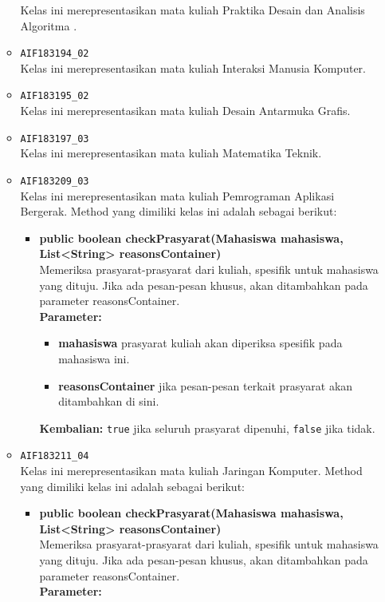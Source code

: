 \begin{enumerate}
\begin{itemize}
		Kelas ini merepresentasikan mata kuliah Praktika Desain dan Analisis Algoritma .
		\item \texttt{AIF183194\_02} \\
		Kelas ini merepresentasikan mata kuliah Interaksi Manusia Komputer.
		\item \texttt{AIF183195\_02} \\
		Kelas ini merepresentasikan mata kuliah Desain Antarmuka Grafis.
		\item \texttt{AIF183197\_03} \\
		Kelas ini merepresentasikan mata kuliah Matematika Teknik.
		\item \texttt{AIF183209\_03} \\
		Kelas ini merepresentasikan mata kuliah Pemrograman Aplikasi Bergerak. Method yang dimiliki kelas ini adalah sebagai berikut: 
		\begin{itemize}
			\item \textbf{public boolean checkPrasyarat(Mahasiswa mahasiswa, List<String> reasonsContainer)}\\
			Memeriksa prasyarat-prasyarat dari kuliah, spesifik untuk mahasiswa yang dituju. Jika ada pesan-pesan khusus, akan ditambahkan pada parameter reasonsContainer.\\
			\textbf{Parameter:}
			\begin{itemize}
				\item \textbf{mahasiswa} prasyarat kuliah akan diperiksa spesifik pada mahasiswa ini.
				\item \textbf{reasonsContainer} jika pesan-pesan terkait prasyarat akan ditambahkan di sini.
			\end{itemize}
			\textbf{Kembalian:} \texttt{true} jika seluruh prasyarat dipenuhi, \texttt{false} jika tidak.
		\end{itemize}
		\item \texttt{AIF183211\_04} \\
		Kelas ini merepresentasikan mata kuliah Jaringan Komputer. Method yang dimiliki kelas ini adalah sebagai berikut: 
		\begin{itemize}
			\item \textbf{public boolean checkPrasyarat(Mahasiswa mahasiswa, List<String> reasonsContainer)}\\
			Memeriksa prasyarat-prasyarat dari kuliah, spesifik untuk mahasiswa yang dituju. Jika ada pesan-pesan khusus, akan ditambahkan pada parameter reasonsContainer.\\
			\textbf{Parameter:}
			\begin{itemize}

\end{itemize}
\end{itemize}
\end{itemize}
\end{enumerate}
